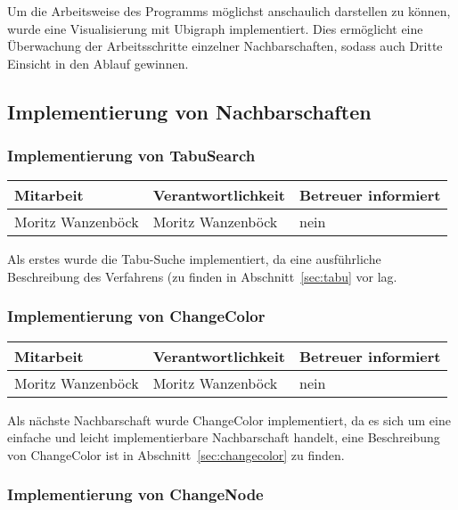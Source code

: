 Um die Arbeitsweise des Programms möglichst anschaulich darstellen zu können, wurde eine Visualisierung mit Ubigraph implementiert. Dies ermöglicht eine Überwachung der Ar\-beits\-schrit\-te einzelner Nachbarschaften, sodass auch Dritte Einsicht in den Ablauf gewinnen.

\subsection{Implementierung von Nachbarschaften}

\subsubsection{ Implementierung von TabuSearch}

\begin{center}
\begin{tabular}{lll}
	Mitarbeit & Verantwortlichkeit & Betreuer informiert \\
	\hline
	Moritz Wanzenböck & Moritz Wanzenböck & nein \\
\end{tabular}
\end{center}

Als erstes wurde die Tabu-Suche implementiert, da eine ausführliche Beschreibung des Verfahrens (zu finden in Abschnitt~\ref{sec:tabu} vor lag.

\subsubsection{ Implementierung von ChangeColor}
\begin{center}
\begin{tabular}{lll}
	Mitarbeit & Verantwortlichkeit & Betreuer informiert \\
	\hline
	Moritz Wanzenböck & Moritz Wanzenböck & nein \\
\end{tabular}
\end{center}

Als nächste Nachbarschaft wurde ChangeColor implementiert, da es sich um eine einfache und leicht implementierbare Nachbarschaft handelt, eine Beschreibung von ChangeColor ist in Abschnitt~\ref{sec:changecolor} zu finden.

\subsubsection{ Implementierung von ChangeNode} 

